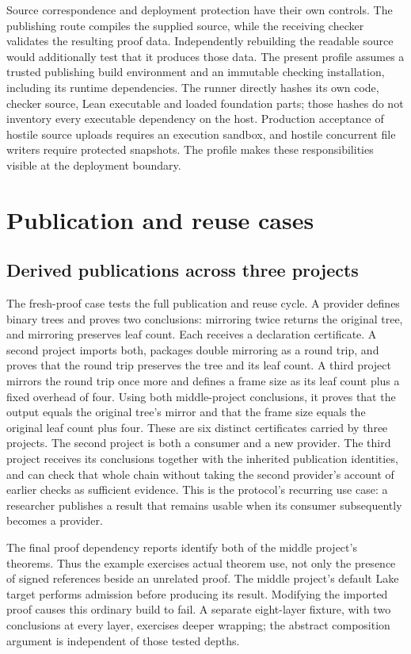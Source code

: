 \documentclass[11pt]{article}
\begin{document}
Source correspondence and deployment protection have their own controls.
The publishing route compiles the supplied source, while the receiving checker
validates the resulting proof data. Independently rebuilding the readable
source would additionally test that it produces those data. The present
profile assumes a trusted publishing build environment and an immutable
checking installation, including its runtime dependencies. The runner directly
hashes its own code, checker source, Lean executable and loaded foundation
parts; those hashes do not inventory every executable dependency on the host.
Production acceptance of hostile source uploads requires an execution sandbox,
and hostile concurrent file writers require protected snapshots. The profile
makes these responsibilities visible at the deployment boundary.

\section{Publication and reuse cases}

\subsection{Derived publications across three projects}

The fresh-proof case tests the full publication and reuse cycle. A provider defines binary trees and proves two conclusions:
mirroring twice returns the original tree, and mirroring preserves leaf count.
Each receives a declaration certificate. A second project imports both,
packages double mirroring as a round trip, and proves that the round trip
preserves the tree and its leaf count. A third project mirrors the round trip
once more and defines a frame size as its leaf count plus a fixed overhead of
four. Using both middle-project conclusions, it proves that the output equals
the original tree's mirror and that the frame size equals the original leaf
count plus four. These are six distinct
certificates carried by three projects. The second project is both a consumer
and a new provider. The third project receives its conclusions together with
the inherited publication identities, and can check that whole chain without
taking the second provider's account of earlier checks as sufficient evidence.
This is the protocol's recurring use case: a researcher publishes a result
that remains usable when its consumer subsequently becomes a provider.

The final proof dependency reports identify both of the middle project's
theorems. Thus the example exercises actual theorem use, not only the presence
of signed references beside an unrelated proof. The middle project's default
Lake target performs admission before producing its result. Modifying the
imported proof causes this ordinary build to fail. A separate eight-layer
fixture, with two conclusions at every layer, exercises deeper wrapping; the
abstract composition argument is independent of those tested depths.
\end{document}
